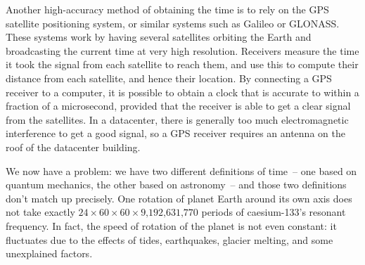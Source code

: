 Another high-accuracy method of obtaining the time is to rely on the GPS satellite positioning system, or similar systems such as Galileo or GLONASS.
These systems work by having several satellites orbiting the Earth and broadcasting the current time at very high resolution.
Receivers measure the time it took the signal from each satellite to reach them, and use this to compute their distance from each satellite, and hence their location.
By connecting a GPS receiver to a computer, it is possible to obtain a clock that is accurate to within a fraction of a microsecond, provided that the receiver is able to get a clear signal from the satellites.
In a datacenter, there is generally too much electromagnetic interference to get a good signal, so a GPS receiver requires an antenna on the roof of the datacenter building.

We now have a problem: we have two different definitions of time~-- one based on quantum mechanics, the other based on astronomy~-- and those two definitions don't match up precisely.
One rotation of planet Earth around its own axis does not take exactly $24 \times 60 \times 60 \times \text{9,192,631,770}$ periods of caesium-133's resonant frequency.
In fact, the speed of rotation of the planet is not even constant: it fluctuates due to the effects of tides, earthquakes, glacier melting, and some unexplained factors.

